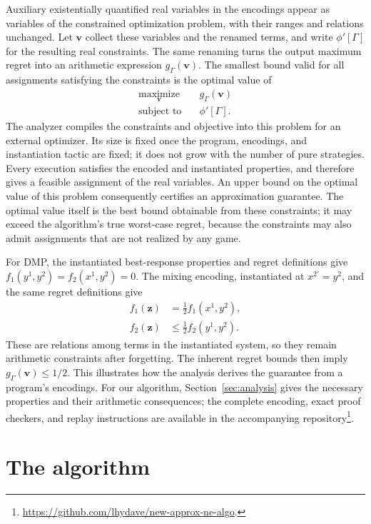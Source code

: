 \documentclass[11pt]{article}
\theoremstyle{remark}
\theoremstyle{plain}
\begin{document}
Auxiliary existentially quantified real variables in the encodings appear
as variables of the constrained optimization problem, with their ranges and
relations unchanged. Let $\boldsymbol v$ collect these variables and
the renamed terms, and write $\phi'[\Gamma]$ for the resulting real
constraints. The same renaming turns the output maximum regret into
an arithmetic expression $g_\Gamma(\boldsymbol v)$.
The smallest bound valid for all assignments satisfying the constraints
is the optimal value of
\[
 \begin{aligned}
  \operatorname*{maximize}_{\boldsymbol v}\quad
       &g_\Gamma(\boldsymbol v)\\
  \text{subject to}\quad&\phi'[\Gamma].
 \end{aligned}
\]
The analyzer compiles the constraints and objective into this problem
for an external optimizer. Its size is fixed once the program,
encodings, and instantiation tactic are fixed; it does not grow with
the number of pure strategies.
Every execution satisfies the encoded and instantiated properties,
and therefore gives a feasible assignment of the real variables.
An upper bound on the optimal value of this problem consequently
certifies an approximation guarantee. The optimal value itself is the
best bound obtainable from these constraints; it may exceed the
algorithm's true worst-case regret, because the constraints may also
admit assignments that are not realized by any game.

For DMP, the instantiated best-response properties and regret
definitions give $f_1(y^1,y^2)=f_2(x^1,y^2)=0$.
The mixing encoding, instantiated at $x^{2\prime}=y^2$, and the same
regret definitions give
\[
 \begin{aligned}
  f_1(\boldsymbol z)&=\tfrac12 f_1(x^1,y^2),\\
  f_2(\boldsymbol z)&\le\tfrac12 f_2(y^1,y^2).
 \end{aligned}
\]
These are relations among terms in the instantiated system, so they
remain arithmetic constraints after forgetting. The inherent regret
bounds then imply $g_\Gamma(\boldsymbol v)\le1/2$. This illustrates how the
analysis derives the guarantee from a program's encodings. For our
algorithm, Section~\ref{sec:analysis} gives the necessary properties
and their arithmetic consequences; the complete encoding, exact proof
checkers, and replay instructions are available in the
accompanying repository\footnote{\url{https://github.com/lhydave/new-approx-ne-algo}.\label{fn:code}}.

\section{The algorithm}
\label{sec:algorithm}
\end{document}
